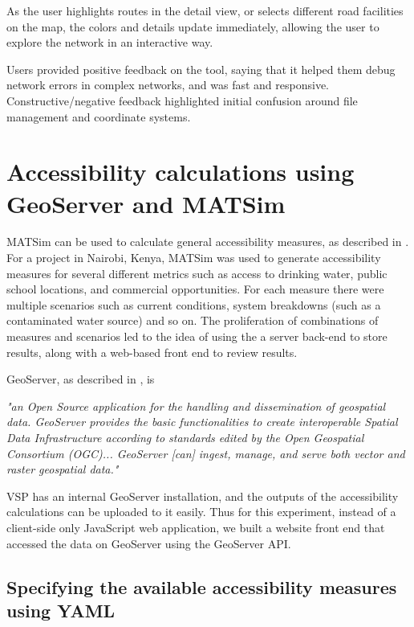 As the user highlights routes in the detail view, or selects different road facilities on the map, the colors and details update immediately, allowing the user to explore the network in an interactive way.

Users provided positive feedback on the tool, saying that it helped them debug network errors in complex networks, and was fast and responsive. Constructive/negative feedback highlighted initial confusion around file management and coordinate systems.

\hypertarget{server-experiments-geoserver}{%
\section{Accessibility calculations using GeoServer and MATSim}\label{server-experiments-geoserver}}

MATSim can be used to calculate general accessibility measures, as described in \cite{ziemke2018accessibility}. For a project in Nairobi, Kenya, MATSim was used to generate accessibility measures for several different metrics such as access to drinking water, public school locations, and commercial opportunities. For each measure there were multiple scenarios such as current conditions, system breakdowns (such as a contaminated water source) and so on. The proliferation of combinations of measures and scenarios led to the idea of using the a server back-end to store results, along with a web-based front end to review results.

GeoServer, as described in \cite{giannecchini2013geoserver}, is

\begin{displayquote}
\emph{"an Open Source application for the handling and dissemination of geospatial data. GeoServer provides the basic functionalities to create interoperable Spatial Data Infrastructure according to standards edited by the Open Geospatial Consortium (OGC)... GeoServer [can] ingest, manage, and serve both vector and raster geospatial data."}
\end{displayquote}

VSP has an internal GeoServer installation, and the outputs of the accessibility calculations can be uploaded to it easily. Thus for this experiment, instead of a client-side only JavaScript web application, we built a website front end that accessed the data on GeoServer using the GeoServer API.

\hypertarget{server-experiments-geoserver-2}{%
\subsection{Specifying the available accessibility measures using YAML}
\label{server-experiments-geoserver-2}}


